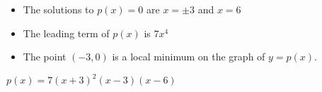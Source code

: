 {\begin{itemize}

\item The solutions to $p(x) = 0$ are $x = \pm 3$ and $x=6$
\item The leading term of $p(x)$ is $7x^4$
\item The point $(-3,0)$ is a local minimum on the graph of $y=p(x)$.

\end{itemize}}
{ $p(x) = 7(x+3)^2(x-3)(x-6)$}